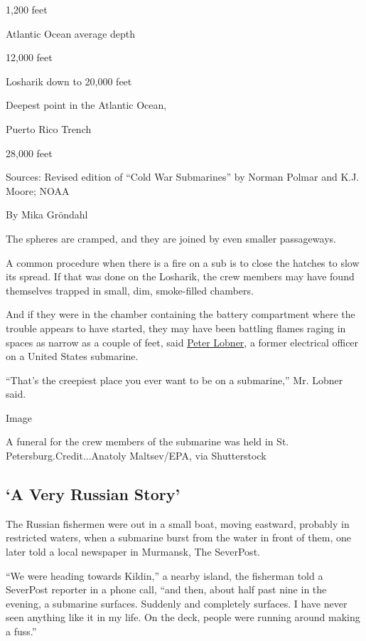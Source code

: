 1,200 feet

Atlantic Ocean average depth

12,000 feet

Losharik down to 20,000 feet

Deepest point in the Atlantic Ocean,

Puerto Rico Trench

28,000 feet

Sources: Revised edition of ``Cold War Submarines'' by Norman Polmar and
K.J. Moore; NOAA

By Mika Gröndahl

The spheres are cramped, and they are joined by even smaller
passageways.

A common procedure when there is a fire on a sub is to close the hatches
to slow its spread. If that was done on the Losharik, the crew members
may have found themselves trapped in small, dim, smoke-filled chambers.

And if they were in the chamber containing the battery compartment where
the trouble appears to have started, they may have been battling flames
raging in spaces as narrow as a couple of feet, said
\href{https://lynceans.org/author/pete/}{Peter Lobner}, a former
electrical officer on a United States submarine.

``That's the creepiest place you ever want to be on a submarine,'' Mr.
Lobner said.

Image

A funeral for the crew members of the submarine was held in St.
Petersburg.Credit...Anatoly Maltsev/EPA, via Shutterstock

\hypertarget{a-very-russian-story}{%
\subsection{`A Very Russian Story'}\label{a-very-russian-story}}

The Russian fishermen were out in a small boat, moving eastward,
probably in restricted waters, when a submarine burst from the water in
front of them, one later told a local newspaper in Murmansk, The
SeverPost.

``We were heading towards Kildin,'' a nearby island, the fisherman told
a SeverPost reporter in a phone call, ``and then, about half past nine
in the evening, a submarine surfaces. Suddenly and completely surfaces.
I have never seen anything like it in my life. On the deck, people were
running around making a fuss.''

